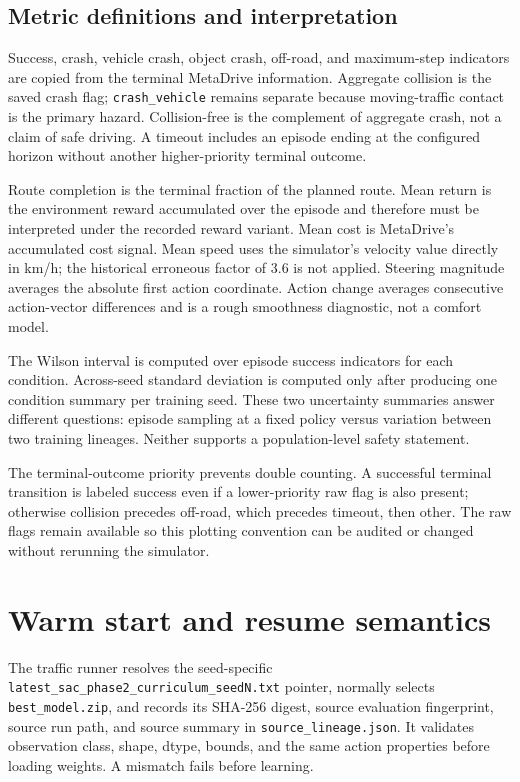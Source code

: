 \documentclass[10pt,twocolumn]{article}
\begin{document}
\subsection{Metric definitions and interpretation}
Success, crash, vehicle crash, object crash, off-road, and maximum-step indicators are
copied from the terminal MetaDrive information. Aggregate collision is the saved crash
flag; \texttt{crash\_vehicle} remains separate because moving-traffic contact is the
primary hazard. Collision-free is the complement of aggregate crash, not a claim of safe
driving. A timeout includes an episode ending at the configured horizon without another
higher-priority terminal outcome.

Route completion is the terminal fraction of the planned route. Mean return is the
environment reward accumulated over the episode and therefore must be interpreted under
the recorded reward variant. Mean cost is MetaDrive's accumulated cost signal. Mean speed
uses the simulator's velocity value directly in km/h; the historical erroneous factor of
3.6 is not applied. Steering magnitude averages the absolute first action coordinate.
Action change averages consecutive action-vector differences and is a rough smoothness
diagnostic, not a comfort model.

The Wilson interval is computed over episode success indicators for each condition.
Across-seed standard deviation is computed only after producing one condition summary per
training seed. These two uncertainty summaries answer different questions: episode
sampling at a fixed policy versus variation between two training lineages. Neither
supports a population-level safety statement.

The terminal-outcome priority prevents double counting. A successful terminal transition
is labeled success even if a lower-priority raw flag is also present; otherwise collision
precedes off-road, which precedes timeout, then other. The raw flags remain available so
this plotting convention can be audited or changed without rerunning the simulator.

\section{Warm start and resume semantics}
The traffic runner resolves the seed-specific
\texttt{latest\_sac\_phase2\_curriculum\_seedN.txt} pointer, normally selects
\texttt{best\_model.zip}, and records its SHA-256 digest, source evaluation fingerprint,
source run path, and source summary in \texttt{source\_lineage.json}. It validates
observation class, shape, dtype, bounds, and the same action properties before loading
weights. A mismatch fails before learning.
\end{document}
